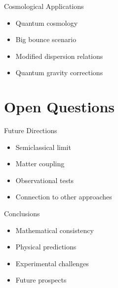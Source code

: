 \documentclass{beamer}
\begin{document}
\begin{frame}{Cosmological Applications}
\begin{itemize}
\item Quantum cosmology
\item Big bounce scenario
\item Modified dispersion relations
\item Quantum gravity corrections
\end{itemize}
\end{frame}

\section{Open Questions}
\begin{frame}{Future Directions}
\begin{itemize}
\item Semiclassical limit
\item Matter coupling
\item Observational tests
\item Connection to other approaches
\end{itemize}
\end{frame}

\begin{frame}{Conclusions}
\begin{itemize}
\item Mathematical consistency
\item Physical predictions
\item Experimental challenges
\item Future prospects
\end{itemize}
\end{frame}
\end{document}
